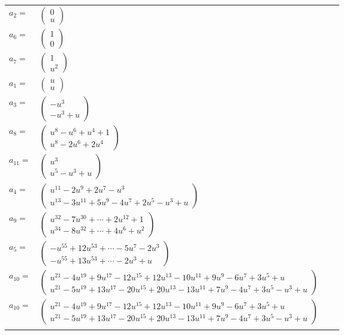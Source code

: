 \documentclass[1p]{elsarticle_modified}
\theoremstyle{definition}
\begin{document}
\begin{tabular}{m{7pt} m{180pt} m{7pt} m{180pt} }
\flushright $a_{2}=$&$\begin{pmatrix}0\\u\end{pmatrix}$ \\
\flushright $a_{6}=$&$\begin{pmatrix}1\\0\end{pmatrix}$ \\
\flushright $a_{7}=$&$\begin{pmatrix}1\\u^2\end{pmatrix}$ \\
\flushright $a_{1}=$&$\begin{pmatrix}u\\u\end{pmatrix}$ \\
\flushright $a_{3}=$&$\begin{pmatrix}- u^3\\- u^3+u\end{pmatrix}$ \\
\flushright $a_{8}=$&$\begin{pmatrix}u^8- u^6+u^4+1\\u^8-2 u^6+2 u^4\end{pmatrix}$ \\
\flushright $a_{11}=$&$\begin{pmatrix}u^3\\u^5- u^3+u\end{pmatrix}$ \\
\flushright $a_{4}=$&$\begin{pmatrix}u^{11}-2 u^9+2 u^7- u^3\\u^{13}-3 u^{11}+5 u^9-4 u^7+2 u^5- u^3+u\end{pmatrix}$ \\
\flushright $a_{9}=$&$\begin{pmatrix}u^{32}-7 u^{30}+\cdots+2 u^{12}+1\\u^{34}-8 u^{32}+\cdots+4 u^6+u^2\end{pmatrix}$ \\
\flushright $a_{5}=$&$\begin{pmatrix}- u^{55}+12 u^{53}+\cdots-5 u^7-2 u^3\\- u^{55}+13 u^{53}+\cdots-2 u^3+u\end{pmatrix}$ \\
\flushright $a_{10}=$&$\begin{pmatrix}u^{21}-4 u^{19}+9 u^{17}-12 u^{15}+12 u^{13}-10 u^{11}+9 u^9-6 u^7+3 u^5+u\\u^{21}-5 u^{19}+13 u^{17}-20 u^{15}+20 u^{13}-13 u^{11}+7 u^9-4 u^7+3 u^5- u^3+u\end{pmatrix}$\\ \flushright $a_{10}=$&$\begin{pmatrix}u^{21}-4 u^{19}+9 u^{17}-12 u^{15}+12 u^{13}-10 u^{11}+9 u^9-6 u^7+3 u^5+u\\u^{21}-5 u^{19}+13 u^{17}-20 u^{15}+20 u^{13}-13 u^{11}+7 u^9-4 u^7+3 u^5- u^3+u\end{pmatrix}$\\&\end{tabular}
\end{document}
